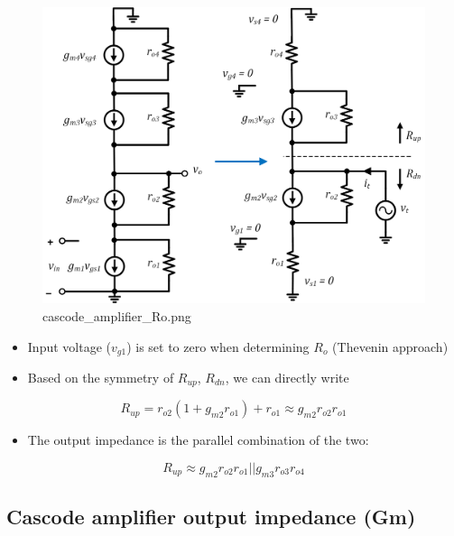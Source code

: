 \documentclass[11pt]{article}
\providecommand{\tightlist}{%
      \setlength{\itemsep}{0pt}\setlength{\parskip}{0pt}}
\begin{document}
    \begin{figure}
\centering
\includegraphics{cascode_amplifier_Ro.png}
\caption{cascode\_amplifier\_Ro.png}
\end{figure}

    \begin{itemize}
\tightlist
\item
  Input voltage (\(v_{g1}\)) is set to zero when determining \(R_o\)
  (Thevenin approach)
\item
  Based on the symmetry of \(R_{up}\), \(R_{dn}\), we can directly write
\end{itemize}

\begin{equation}
R_{up} = r_{o2}(1+g_{m2} r_{o1}) + r_{o1} \approx g_{m2}r_{o2}r_{o1}
\end{equation}

\begin{itemize}
\tightlist
\item
  The output impedance is the parallel combination of the two:
\end{itemize}

\begin{equation}
R_{up} \approx g_{m2}r_{o2}r_{o1}||g_{m3}r_{o3}r_{o4}
\end{equation}

    \hypertarget{cascode-amplifier-output-impedance-gm}{%
\subsection{Cascode amplifier output impedance
(Gm)}\label{cascode-amplifier-output-impedance-gm}}
\end{document}

